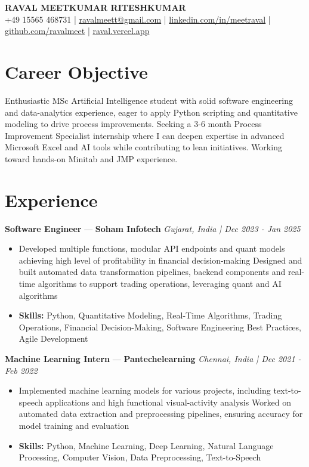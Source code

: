 \documentclass[a4paper,10pt]{article}
\begin{document}
\begin{center}
  {\Large\bfseries RAVAL MEETKUMAR RITESHKUMAR}\\[2pt]
  {\small +49 15565 468731 \;|\; \href{mailto:ravalmeett@gmail.com}{ravalmeett@gmail.com} \;|\; \href{https://www.linkedin.com/in/meetraval/}{linkedin.com/in/meetraval} \;|\; \href{https://github.com/ravalmeet}{github.com/ravalmeet} \;|\; \href{https://raval.vercel.app/}{raval.vercel.app}}
\end{center}
\vspace{-3pt}

\section*{Career Objective}
Enthusiastic MSc Artificial Intelligence student with solid software engineering and data-analytics experience, eager to apply Python scripting and quantitative modeling to drive process improvements. Seeking a 3-6 month Process Improvement Specialist internship where I can deepen expertise in advanced Microsoft Excel and AI tools while contributing to lean initiatives. Working toward hands-on Minitab and JMP experience.\par

\section*{Experience}
\textbf{Software Engineer} — \textbf{Soham Infotech} \hfill \textit{Gujarat, India \;|\; Dec 2023 - Jan 2025}\par
\vspace{1pt}
\begin{itemize}
  \item Developed multiple functions, modular API endpoints and quant models achieving high level of profitability in financial decision-making Designed and built automated data transformation pipelines, backend components and real-time algorithms to support trading operations, leveraging quant and AI algorithms
  \item \textbf{Skills:} Python, Quantitative Modeling, Real-Time Algorithms, Trading Operations, Financial Decision-Making, Software Engineering Best Practices, Agile Development
\end{itemize}
\vspace{3pt}
\textbf{Machine Learning Intern} — \textbf{Pantechelearning} \hfill \textit{Chennai, India \;|\; Dec 2021 - Feb 2022}\par
\vspace{1pt}
\begin{itemize}
  \item Implemented machine learning models for various projects, including text-to-speech applications and high functional visual-activity analysis Worked on automated data extraction and preprocessing pipelines, ensuring accuracy for model training and evaluation
  \item \textbf{Skills:} Python, Machine Learning, Deep Learning, Natural Language Processing, Computer Vision, Data Preprocessing, Text-to-Speech
\end{itemize}
\end{document}
